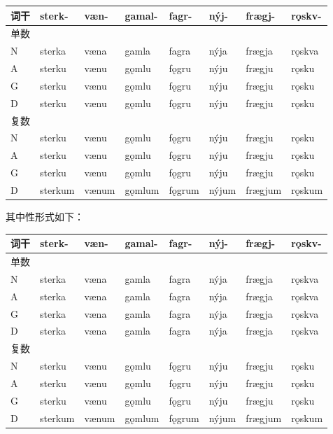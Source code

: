 \begin{longtable}{llllllll}
  \toprule
  词干 & sterk-  & væn-  & gamal- & fagr-  & nýj-  & frægj-  & rǫskv- \\
  \midrule
  \endhead
  \bottomrule
  \endfoot
  单数 &         &       &        &        &       &         &        \\
  N  & sterka  & væna  & gamla  & fagra  & nýja  & frægja  & rǫskva \\
  A  & sterku  & vænu  & gǫmlu  & fǫgru  & nýju  & frægju  & rǫsku  \\
  G  & sterku  & vænu  & gǫmlu  & fǫgru  & nýju  & frægju  & rǫsku  \\
  D  & sterku  & vænu  & gǫmlu  & fǫgru  & nýju  & frægju  & rǫsku  \\
  复数 &         &       &        &        &       &         &        \\
  N  & sterku  & vænu  & gǫmlu  & fǫgru  & nýju  & frægju  & rǫsku  \\
  A  & sterku  & vænu  & gǫmlu  & fǫgru  & nýju  & frægju  & rǫsku  \\
  G  & sterku  & vænu  & gǫmlu  & fǫgru  & nýju  & frægju  & rǫsku  \\
  D  & sterkum & vænum & gǫmlum & fǫgrum & nýjum & frægjum & rǫskum \\
\end{longtable}

其中性形式如下：

\begin{longtable}{llllllll}
  \toprule
  词干 & sterk-  & væn-  & gamal- & fagr-  & nýj-  & frægj-  & rǫskv- \\
  \midrule
  \endhead
  \bottomrule
  \endfoot
  单数 &         &       &        &        &       &         &        \\
  N  & sterka  & væna  & gamla  & fagra  & nýja  & frægja  & rǫskva \\
  A  & sterka  & væna  & gamla  & fagra  & nýja  & frægja  & rǫskva \\
  G  & sterka  & væna  & gamla  & fagra  & nýja  & frægja  & rǫskva \\
  D  & sterka  & væna  & gamla  & fagra  & nýja  & frægja  & rǫskva \\
  复数 &         &       &        &        &       &         &        \\
  N  & sterku  & vænu  & gǫmlu  & fǫgru  & nýju  & frægju  & rǫsku  \\
  A  & sterku  & vænu  & gǫmlu  & fǫgru  & nýju  & frægju  & rǫsku  \\
  G  & sterku  & vænu  & gǫmlu  & fǫgru  & nýju  & frægju  & rǫsku  \\
  D  & sterkum & vænum & gǫmlum & fǫgrum & nýjum & frægjum & rǫskum \\
\end{longtable}

